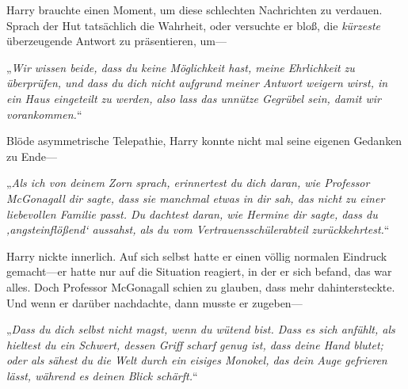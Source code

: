 Harry brauchte einen Moment, um diese schlechten Nachrichten zu verdauen. Sprach der Hut tatsächlich die Wahrheit, oder versuchte er bloß, die \emph{kürzeste} überzeugende Antwort zu präsentieren, um—

„\emph{Wir wissen beide, dass du keine Möglichkeit hast, meine Ehrlichkeit zu überprüfen, und dass du dich nicht aufgrund meiner Antwort weigern wirst, in ein Haus eingeteilt zu werden, also lass das unnütze Gegrübel sein, damit wir vorankommen.}“

Blöde asymmetrische Telepathie, Harry konnte nicht mal seine eigenen Gedanken zu Ende—

„\emph{Als ich von deinem Zorn sprach, erinnertest du dich daran, wie Professor McGonagall dir sagte, dass sie manchmal etwas in dir sah, das nicht zu einer liebevollen Familie passt. Du dachtest daran, wie Hermine dir sagte, dass du ‚angsteinflößend‘ aussahst, als du vom Vertrauensschülerabteil zurückkehrtest.}“

Harry nickte innerlich. Auf sich selbst hatte er einen völlig normalen Eindruck gemacht—er hatte nur auf die Situation reagiert, in der er sich befand, das war alles. Doch Professor McGonagall schien zu glauben, dass mehr dahintersteckte. Und wenn er darüber nachdachte, dann musste er zugeben—

„\emph{Dass du dich selbst nicht magst, wenn du wütend bist. Dass es sich anfühlt, als hieltest du ein Schwert, dessen Griff scharf genug ist, dass deine Hand blutet; oder als sähest du die Welt durch ein eisiges Monokel, das dein Auge gefrieren lässt, während es deinen Blick schärft.}“

